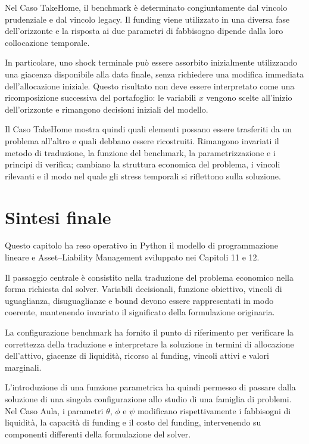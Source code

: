 Nel Caso TakeHome, il benchmark \`e determinato congiuntamente dal vincolo
prudenziale e dal vincolo legacy. Il funding viene utilizzato in una diversa
fase dell'orizzonte e la risposta ai due parametri di fabbisogno dipende dalla
loro collocazione temporale.

In particolare, uno shock terminale pu\`o essere assorbito inizialmente
utilizzando una giacenza disponibile alla data finale, senza richiedere una
modifica immediata dell'allocazione iniziale. Questo risultato non deve essere
interpretato come una ricomposizione successiva del portafoglio: le variabili
$x$ vengono scelte all'inizio dell'orizzonte e rimangono decisioni iniziali
del modello.

Il Caso TakeHome mostra quindi quali elementi possano essere trasferiti da un
problema all'altro e quali debbano essere ricostruiti. Rimangono invariati il
metodo di traduzione, la funzione del benchmark, la parametrizzazione e i
principi di verifica; cambiano la struttura economica del problema, i vincoli
rilevanti e il modo nel quale gli stress temporali si riflettono sulla
soluzione.


\section{Sintesi finale}

Questo capitolo ha reso operativo in Python il modello di programmazione
lineare e Asset--Liability Management sviluppato nei Capitoli 11 e 12.

Il passaggio centrale \`e consistito nella traduzione del problema economico
nella forma richiesta dal solver. Variabili decisionali, funzione obiettivo,
vincoli di uguaglianza, disuguaglianze e bound devono essere rappresentati in
modo coerente, mantenendo invariato il significato della formulazione
originaria.

La configurazione benchmark ha fornito il punto di riferimento per verificare
la correttezza della traduzione e interpretare la soluzione in termini di
allocazione dell'attivo, giacenze di liquidit\`a, ricorso al funding, vincoli
attivi e valori marginali.

L'introduzione di una funzione parametrica ha quindi permesso di passare dalla
soluzione di una singola configurazione allo studio di una famiglia di
problemi. Nel Caso Aula, i parametri $\theta$, $\phi$ e $\psi$ modificano
rispettivamente i fabbisogni di liquidit\`a, la capacit\`a di funding e il
costo del funding, intervenendo su componenti differenti della formulazione
del solver.


